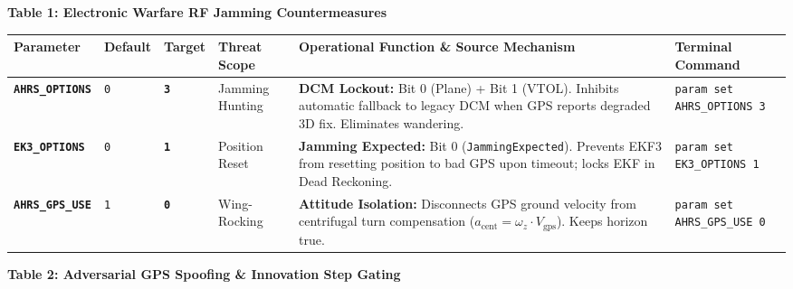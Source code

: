 \documentclass[10pt,letterpaper]{article}
\begin{document}
\vspace{3.5mm}

\vspace{1.5mm}
\noindent\textbf{\normalsize Table 1: Electronic Warfare RF Jamming Countermeasures}
\vspace{0.8mm}

\noindent
\footnotesize
\renewcommand{\arraystretch}{1.2}
\begin{tabularx}{\textwidth}{L{0.18\textwidth} C{0.07\textwidth} C{0.08\textwidth} L{0.14\textwidth} Y L{0.25\textwidth}}
\toprule
{}
\textbf{Parameter} & \textbf{Default} & \textbf{Target} & \textbf{Threat Scope} & \textbf{Operational Function \& Source Mechanism} & \textbf{Terminal Command} \\
\midrule
\texttt{\bfseries AHRS\_OPTIONS} & \texttt{0} & \texttt{\bfseries 3} & Jamming Hunting & 
\textbf{DCM Lockout:} Bit 0 (Plane) + Bit 1 (VTOL). Inhibits automatic fallback to legacy DCM when GPS reports degraded 3D fix. Eliminates wandering. & 
\texttt{\scriptsize\color{cmdgreen}param set AHRS\_OPTIONS 3} \\
\texttt{\bfseries EK3\_OPTIONS} & \texttt{0} & \texttt{\bfseries 1} & Position Reset & 
\textbf{Jamming Expected:} Bit 0 (\texttt{JammingExpected}). Prevents EKF3 from resetting position to bad GPS upon timeout; locks EKF in Dead Reckoning. & 
\texttt{\scriptsize\color{cmdgreen}param set EK3\_OPTIONS 1} \\
\texttt{\bfseries AHRS\_GPS\_USE} & \texttt{1} & \texttt{\bfseries 0} & Wing-Rocking & 
\textbf{Attitude Isolation:} Disconnects GPS ground velocity from centrifugal turn compensation ($a_{\text{cent}} = \omega_z \cdot V_{\text{gps}}$). Keeps horizon true. & 
\texttt{\scriptsize\color{cmdgreen}param set AHRS\_GPS\_USE 0} \\
\bottomrule
\end{tabularx}

\vspace{3.5mm}
\noindent\textbf{\normalsize Table 2: Adversarial GPS Spoofing \& Innovation Step Gating}
\vspace{0.8mm}
\end{document}
